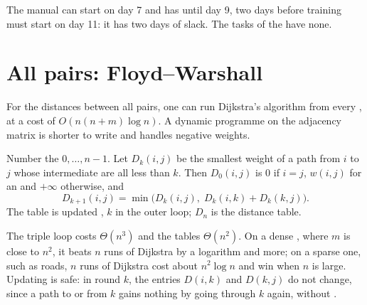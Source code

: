 \label{out:b1:shortest-paths:dag}

The manual can start on day 7 and has until day 9, two days before training must start on day 11: it has two days of
slack. The tasks of
the  have none.

\section{All pairs: Floyd--Warshall}\label{sec:b1:shortest-paths:floyd}

For the distances between all pairs, one can run Dijkstra's algorithm from every , at a cost of $O(n (n + m) \log
n)$. A dynamic programme on the adjacency matrix is shorter to write and handles negative weights.

\begin{method}\label{met:b1:shortest-paths:floyd}
Number the  $0, \dots, n - 1$. Let $D_k(i, j)$ be the smallest weight of a path from $i$ to $j$ whose
intermediate  are all less than $k$. Then $D_0(i, j)$ is $0$ if $i = j$, $w(i, j)$ for an  and $+\infty$
otherwise, and
\[ D_{k+1}(i, j) = \min\bigl(D_k(i, j),\; D_k(i, k) + D_k(k, j)\bigr). \]
The table is updated , $k$ in the outer loop; $D_n$ is the distance table.
\end{method}

\label{lst:b1:shortest-paths:floyd}

The triple loop costs $\Theta(n^3)$ and the tables $\Theta(n^2)$. On a dense , where $m$ is close to $n^2$, it beats
$n$ runs of Dijkstra by a logarithm and more; on a sparse one, such as roads, $n$ runs of Dijkstra cost about $n^2
\log n$ and win when $n$ is large. Updating  is safe: in round $k$, the entries $D(i, k)$ and $D(k, j)$ do not
change, since a path to or from $k$ gains nothing by going through $k$ again, without .

